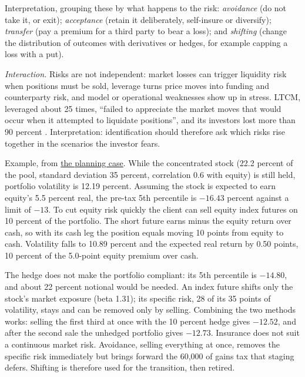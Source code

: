 \begin{qfmethod}
Interpretation, grouping these by what happens to the risk: \emph{avoidance} (do not take it, or exit); \emph{acceptance} (retain it deliberately, self-insure or diversify); \emph{transfer} (pay a premium for a third party to bear a loss); and \emph{shifting} (change the distribution of outcomes with derivatives or hedges, for example capping a loss with a put).

\emph{Interaction.} Risks are not independent: market losses can trigger liquidity risk when positions must be sold, leverage turns price moves into funding and counterparty risk, and model or operational weaknesses show up in stress. LTCM, leveraged about 25 times, ``failed to appreciate the market moves that would occur when it attempted to liquidate positions'', and its investors lost more than 90 percent \citep[chap.~9, p.~623]{managing-investment-portfolios-2007}. Interpretation: identification should therefore ask which risks rise together in the scenarios the investor fears.

 Example, from \hyperref[ex:investment-planning-case]{the planning case}. While the concentrated stock (22.2 percent of the pool, standard deviation 35 percent, correlation 0.6 with equity) is still held, portfolio volatility is 12.19 percent. Assuming the stock is expected to earn equity's 5.5 percent real, the pre-tax 5th percentile is $-16.43$ percent against a limit of $-13$. To cut equity risk quickly the client can sell equity index futures on 10 percent of the portfolio. The short future earns minus the equity return over cash, so with its cash leg the position equals moving 10 points from equity to cash. Volatility falls to 10.89 percent and the expected real return by 0.50 points, 10 percent of the 5.0-point equity premium over cash.

The hedge does not make the portfolio compliant: its 5th percentile is $-14.80$, and about 22 percent notional would be needed. An index future shifts only the stock's market exposure (beta 1.31); its specific risk, 28 of its 35 points of volatility, stays and can be removed only by selling. Combining the two methods works: selling the first third at once with the 10 percent hedge gives $-12.52$, and after the second sale the unhedged portfolio gives $-12.73$. Insurance does not suit a continuous market risk. Avoidance, selling everything at once, removes the specific risk immediately but brings forward the 60{,}000 of gains tax that staging defers. Shifting is therefore used for the transition, then retired.


\end{qfmethod}
